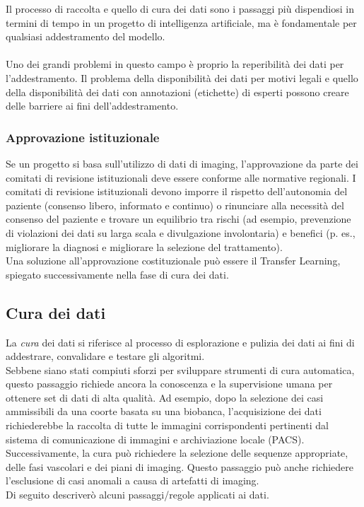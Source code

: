 \documentclass[12pt,a4paper]{report}
\begin{document}
Il processo di raccolta e quello di cura dei dati sono i passaggi più dispendiosi in termini di tempo in un progetto di intelligenza artificiale, ma è fondamentale per qualsiasi addestramento del modello.\\
\\
Uno dei grandi problemi in questo campo è proprio la reperibilità dei dati per l’addestramento.
Il problema della disponibilità dei dati per motivi legali e quello della disponibilità dei dati con annotazioni (etichette) di esperti possono creare delle barriere ai fini dell’addestramento.

\subsubsection{Approvazione istituzionale}
Se un progetto si basa sull’utilizzo di dati di imaging, l'approvazione da parte dei comitati di revisione istituzionali deve essere conforme alle normative regionali. I comitati di revisione istituzionali devono imporre il rispetto dell'autonomia del paziente (consenso libero, informato e continuo) o rinunciare alla necessità del consenso del paziente e trovare un equilibrio tra rischi (ad esempio, prevenzione di violazioni dei dati su larga scala e divulgazione involontaria) e benefici (p. es., migliorare la diagnosi e migliorare la selezione del trattamento).\\
Una soluzione all'approvazione costituzionale può essere il Transfer Learning, spiegato successivamente nella fase di cura dei dati.

\subsection{Cura dei dati}
La \emph{cura} dei dati si riferisce al processo di esplorazione e pulizia dei dati ai fini di addestrare, convalidare e testare gli algoritmi. \\
Sebbene siano stati compiuti sforzi per sviluppare strumenti di cura automatica, questo passaggio richiede ancora la conoscenza e la supervisione umana per ottenere set di dati di alta qualità.
Ad esempio, dopo la selezione dei casi ammissibili da una coorte basata su una biobanca, l'acquisizione dei dati richiederebbe la raccolta di tutte le immagini corrispondenti pertinenti dal sistema di comunicazione di immagini e archiviazione locale (PACS). Successivamente, la cura può richiedere la selezione delle sequenze appropriate, delle fasi vascolari e dei piani di imaging. Questo passaggio può anche richiedere l'esclusione di casi anomali a causa di artefatti di imaging.\\
Di seguito descriverò alcuni passaggi/regole applicati ai dati.
\end{document}

